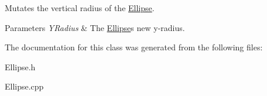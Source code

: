 Mutates the vertical radius of the \hyperlink{classtsgl_1_1_ellipse}{Ellipse}. 


\begin{DoxyParams}{Parameters}
{\em Y\+Radius} & The \hyperlink{classtsgl_1_1_ellipse}{Ellipse}\textquotesingle{}s new y-\/radius. \\
\hline
\end{DoxyParams}


The documentation for this class was generated from the following files\+:\begin{DoxyCompactItemize}
\item 
Ellipse.\+h\item 
Ellipse.\+cpp\end{DoxyCompactItemize}
